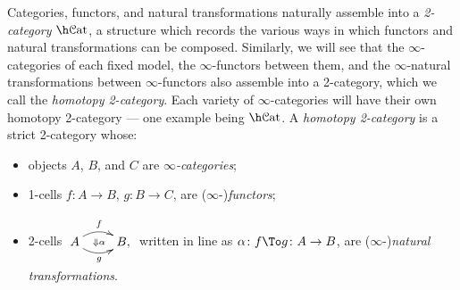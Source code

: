 \documentclass[12pt,reqno]{amsart}
\theoremstyle{plain}
\theoremstyle{definition}
\theoremstyle{remark}
\numberwithin{equation}{subsection}
\renewcommand{\Cat}{\mathcal{C}\mathrm{at}}
\begin{document}
Categories, functors, and natural transformations naturally assemble into a \emph{2-category} $\h\Cat$, a structure which records the various ways in which functors and natural transformations can be composed. Similarly, we will see that the $\infty$-categories of each fixed model, the $\infty$-functors between them, and the $\infty$-natural transformations between $\infty$-functors also assemble into a 2-category, which we call the \emph{homotopy 2-category}. Each variety of $\infty$-categories will have their own homotopy 2-category --- one example being $\h\Cat$. A \emph{homotopy 2-category} is a strict 2-category whose: 
\begin{itemize} 
\item objects $A$, $B$, and $C$ are \emph{$\infty$-categories};
\item 1-cells $f \colon A \to B$, $g \colon B \to C$, are ($\infty$-)\emph{functors};
\item 2-cells $\xymatrix{ A \ar@/^2ex/[r]^f \ar@/_2ex/[r]_g \ar@{}[r]|{\Downarrow\alpha}& B,}$ written in line as $\alpha \colon f \To g \colon A \to B$, are ($\infty$-)\emph{natural transformations}.
\end{itemize}
\end{document}

